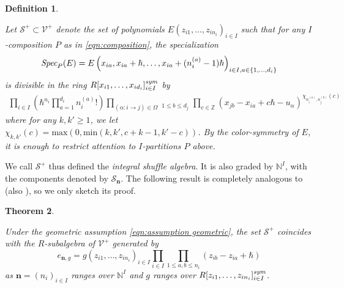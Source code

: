 \documentclass{amsart}
\newtheorem{theorem}{Theorem}[section]
\newtheorem{definition}[theorem]{Definition}
\def\BZ{{\mathbb{Z}}}
\def\CS{{\mathcal{S}}}
\def\CV{{\mathcal{V}}}
\def\nn{{\mathbb{N}^I}}
\def\bn{{\boldsymbol{n}}}
\def\edge{\Omega}
\def\ring{R}
\begin{document}
\begin{definition} 
\label{def:shuffle int}

Let $\CS^+ \subset \CV^+$ denote the set of  polynomials $E(z_{i1},\dots,z_{in_i})_{i \in I}$ such that for any $I$-composition $P$ as in \eqref{eqn:composition}, the specialization
\begin{equation}
\label{eqn:specialization}
\emph{Spec}_P(E) = E \left(x_{ia},x_{ia}+ \hbar,\dots,x_{ia} + (n_i^{(a)}-1)\hbar\right)_{i \in I, a \in \{1,\dots,d_i\}}
\end{equation}
is divisible in the ring $\ring[x_{i1},\dots,x_{id_i}]^{\emph{sym}}_{i \in I}$ by
\begin{multline}
\label{eqn:factor}
\prod_{i \in I} \left( \hbar^{n_i} \prod_{a=1}^{d_i} n_i^{(a)}! \right) \prod_{(\alpha : i \rightarrow j) \in \edge} \mathop{\prod_{1 \leq a \leq d_i}}_{1 \leq b \leq d_j} \prod_{c \in \BZ} \left(x_{jb}-x_{ia}+c\hbar - u_\alpha\right)^{\chi_{n_i^{(a)},n_j^{(b)}}(c)}
\end{multline}
where for any $k,k' \geq 1$, we let $\chi_{k,k'}(c) = \mathrm{max}(0,\mathrm{min}(k, k', c+k-1, k'-c))$. By the color-symmetry of $E$, it is enough to restrict attention to $I$-partitions $P$ above.

\end{definition}

\medskip 

\noindent We call $\CS^+$ thus defined the \emph{integral shuffle algebra}. It is also graded by $\nn$, with the components denoted by $\CS_{\bn}$. The following result is completely analogous to \cite[Theorem 2.6]{JNCoulomb} (also \cite[Proposition 3.9]{Integral}), so we only sketch its proof.

\medskip 

\begin{theorem}
\label{thm:shuffle int}

Under the geometric assumption \eqref{eqn:assumption geometric}, the set $\CS^+$ coincides with the $\ring$-subalgebra of $\CV^+$ generated by
\begin{equation}
\label{eqn:special}
e_{\bn,g} = g(z_{i1},\dots,z_{in_i})_{i \in I} \prod_{i \in I} \prod_{1 \leq a , b \leq n_i} \left(z_{ib}-z_{ia}+\hbar\right)
\end{equation}
as $\bn = (n_i)_{i \in I}$ ranges over $\nn$ and $g$ ranges over $\ring[z_{i1},\dots,z_{in_i}]^{\emph{sym}}_{i \in I}$.

\end{theorem}
\end{document}
